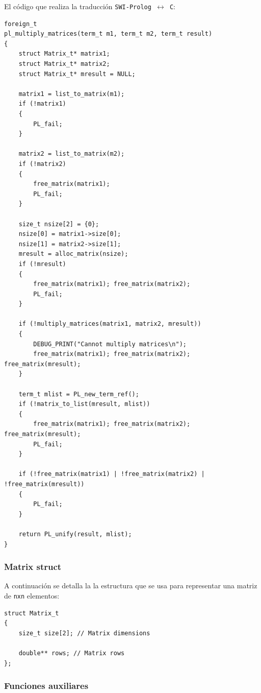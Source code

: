 \documentclass[a4paper]{article}
\begin{document}
El código que realiza la traducción \texttt{SWI-Prolog $\longleftrightarrow$ C}:
\begin{lstlisting}[style=C++]
foreign_t
pl_multiply_matrices(term_t m1, term_t m2, term_t result)
{
	struct Matrix_t* matrix1;
	struct Matrix_t* matrix2;
	struct Matrix_t* mresult = NULL;

	matrix1 = list_to_matrix(m1);
	if (!matrix1)
	{
		PL_fail;
	}

	matrix2 = list_to_matrix(m2);
	if (!matrix2)
	{
		free_matrix(matrix1);
		PL_fail;
	}

	size_t nsize[2] = {0};
	nsize[0] = matrix1->size[0];
	nsize[1] = matrix2->size[1];
	mresult = alloc_matrix(nsize);
    if (!mresult)
    {
		free_matrix(matrix1); free_matrix(matrix2);
        PL_fail;
    }
	
	if (!multiply_matrices(matrix1, matrix2, mresult))
	{
		DEBUG_PRINT("Cannot multiply matrices\n");
		free_matrix(matrix1); free_matrix(matrix2); free_matrix(mresult);
	}

	term_t mlist = PL_new_term_ref();
	if (!matrix_to_list(mresult, mlist))
	{
		free_matrix(matrix1); free_matrix(matrix2); free_matrix(mresult);
        PL_fail;
	}
	
	if (!free_matrix(matrix1) | !free_matrix(matrix2) | !free_matrix(mresult))
	{
		PL_fail;
	}

	return PL_unify(result, mlist);
}
\end{lstlisting}

\subsubsection{Matrix struct}
A continuación se detalla la la estructura que se usa para representar una matriz de \texttt{nxn} elementos:

\begin{lstlisting}[style=C++]
struct Matrix_t
{
    size_t size[2]; // Matrix dimensions

    double** rows; // Matrix rows
};
\end{lstlisting}


\subsubsection{Funciones auxiliares}
\end{document}
